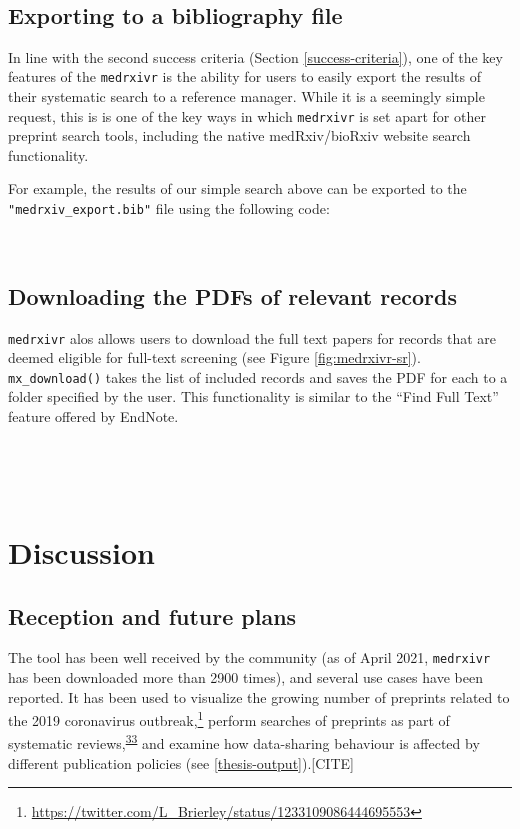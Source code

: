 \documentclass[a4paper, twoside]{templates/ociamthesis}
\begin{document}
~

\hypertarget{exporting-to-a-bibliography-file}{%
\subsection{Exporting to a bibliography file}\label{exporting-to-a-bibliography-file}}

In line with the second success criteria (Section \ref{success-criteria}), one of the key features of the \texttt{medrxivr} is the ability for users to easily export the results of their systematic search to a reference manager. While it is a seemingly simple request, this is is one of the key ways in which \texttt{medrxivr} is set apart for other preprint search tools, including the native medRxiv/bioRxiv website search functionality.

For example, the results of our simple search above can be exported to the \texttt{"medrxiv\_export.bib"} file using the following code:

~

\hypertarget{downloading-the-pdfs-of-relevant-records}{%
\subsection{Downloading the PDFs of relevant records}\label{downloading-the-pdfs-of-relevant-records}}

\texttt{medrxivr} alos allows users to download the full text papers for records that are deemed eligible for full-text screening (see Figure \ref{fig:medrxivr-sr}). \texttt{mx\_download()} takes the list of included records and saves the PDF for each to a folder specified by the user. This functionality is similar to the ``Find Full Text'' feature offered by EndNote.

~

~

\hypertarget{discussion}{%
\section{Discussion}\label{discussion}}

\hypertarget{reception-and-future-plans}{%
\subsection{Reception and future plans}\label{reception-and-future-plans}}

The tool has been well received by the community (as of April 2021, \texttt{medrxivr} has been downloaded more than 2900 times), and several use cases have been reported. It has been used to visualize the growing number of preprints related to the 2019 coronavirus outbreak,\footnote{\url{https://twitter.com/L_Brierley/status/1233109086444695553}} perform searches of preprints as part of systematic reviews,\textsuperscript{\protect\hyperlink{ref-noone2020}{33}} and examine how data-sharing behaviour is affected by different publication policies (see \ref{thesis-output}).{[}CITE{]}
\end{document}
